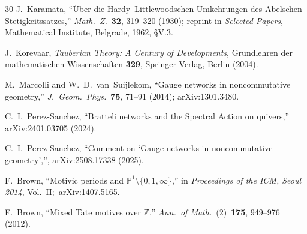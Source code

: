 \documentclass[aps,pra,twocolumn,superscriptaddress,longbibliography]{revtex4-2}
\begin{document}
\begin{thebibliography}{30}
J.~Karamata,
``\"Uber die Hardy--Littlewoodschen Umkehrungen des Abelschen
Stetigkeitssatzes,''
\textit{Math.\ Z.}\ \textbf{32}, 319--320 (1930);
reprint in \textit{Selected Papers}, Mathematical Institute,
Belgrade, 1962, \S V.3.

J.~Korevaar,
\textit{Tauberian Theory: A Century of Developments},
Grundlehren der mathematischen Wissenschaften \textbf{329},
Springer-Verlag, Berlin (2004).

M.~Marcolli and W.~D.~van~Suijlekom,
``Gauge networks in noncommutative geometry,''
\textit{J.~Geom.\ Phys.}\ \textbf{75}, 71--91 (2014);
arXiv:1301.3480.

C.~I.~Perez-Sanchez,
``Bratteli networks and the Spectral Action on quivers,''
arXiv:2401.03705 (2024).

C.~I.~Perez-Sanchez,
``Comment on `Gauge networks in noncommutative geometry','',
arXiv:2508.17338 (2025).

F.~Brown, ``Motivic periods and $\mathbb{P}^1\setminus\{0,1,\infty\}$,'' in
\textit{Proceedings of the ICM, Seoul 2014}, Vol.~II;\ arXiv:1407.5165.

F.~Brown,
``Mixed Tate motives over $\mathbb{Z}$,''
\textit{Ann.\ of Math.}\ (2)~\textbf{175}, 949--976 (2012).

\end{thebibliography}
\end{document}
